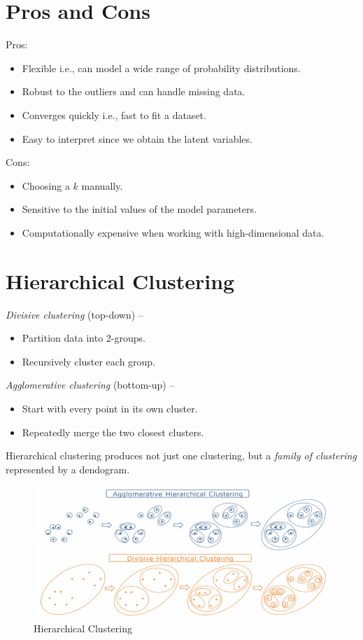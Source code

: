 \documentclass[
	number={6},
	title={Clustering}
]{cs584notes}
\begin{document}
\section{Pros and Cons}\label{sec:gmm-pros-and-cons}
Pros:
\begin{itemize}
	\item Flexible i.e., can model a wide range of probability distributions.
	\item Robust to the outliers and can handle missing data.
	\item Converges quickly i.e., fast to fit a dataset.
	\item Easy to interpret since we obtain the latent variables.
\end{itemize}
Cons:
\begin{itemize}
	\item Choosing a $k$ manually.
	\item Sensitive to the initial values of the model parameters.
	\item Computationally expensive when working with high-dimensional data.
\end{itemize}

\section{Hierarchical Clustering}\label{sec:hierarchical-clustering}
\emph{Divisive clustering} (top-down) --
\begin{itemize}
	\item Partition data into 2-groups.
	\item Recursively cluster each group.
\end{itemize}

\emph{Agglomerative clustering} (bottom-up) --
\begin{itemize}
	\item Start with every point in its own cluster.
	\item Repeatedly merge the two closest clusters.
\end{itemize}

Hierarchical clustering produces not just one clustering, but a \emph{family of clustering} represented by a dendogram.

\begin{figure}[H]
	\centering
	\includegraphics[width=\textwidth]{figures/6/hierarchical_clusterings}
	\caption{Hierarchical Clustering}
	\label{fig:hierarchical-clusterings}
\end{figure}
\end{document}

